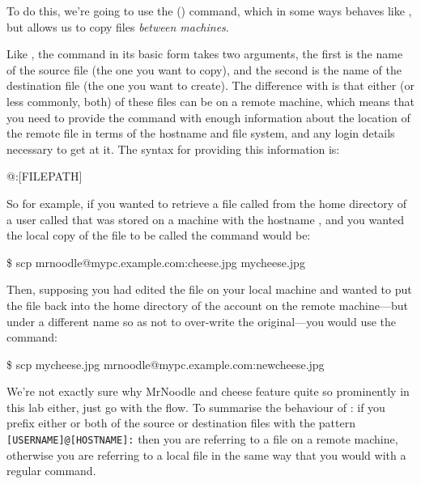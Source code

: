 To do this, we're going to use the  () command, which in some ways behaves like , but
allows us to copy files \textit{between machines}.

Like , the  command in its basic form
takes two arguments, the first is the name of the source file (the one
you want to copy), and the second is the name of the destination file
(the one you want to create). The difference with  is
that either (or less commonly, both) of these files can be on a remote
machine, which means that you need to provide the command with enough
information about the location of the remote file in terms of the
hostname and file system, and any login details necessary to get at
it. The syntax for providing this information is:

\begin{ttoutenv}
[USERNAME]\!@\![HOSTNAME]:[FILEPATH]
\end{ttoutenv}

So for example, if you wanted to retrieve a file called
 from the home directory of a user called
 that was stored on a machine with the hostname
, and you wanted the local copy of the file to
be called  the command would be:

\begin{ttoutenv}
\$ scp mrnoodle@mypc.example.com:cheese.jpg mycheese.jpg
\end{ttoutenv}

Then, supposing you had edited the file  on your
local machine and wanted to put the file back into the home directory
of the  account on the remote machine---but under a
different name so as not to over-write the original---you would use
the command:

\begin{ttoutenv}
\$ scp mycheese.jpg mrnoodle@mypc.example.com:newcheese.jpg
\end{ttoutenv}

We're not exactly sure why MrNoodle and cheese feature quite so
prominently in this lab either, just go with the flow. To summarise
the behaviour of : if you prefix either or both of the
source or destination files with the pattern
\verb|[USERNAME]@[HOSTNAME]:| then you are referring to a file on a
remote machine, otherwise you are referring to a local file in the
same way that you would with a regular  command.

